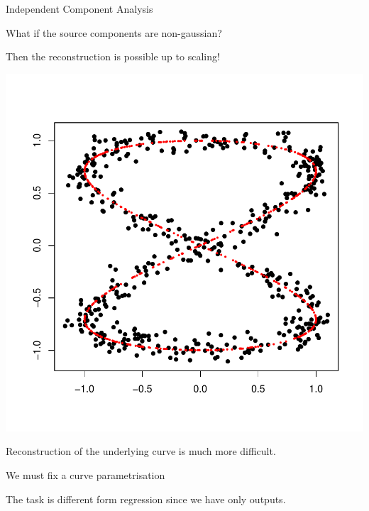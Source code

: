 \documentclass[landscape,footrule]{foils}
\begin{document}
Independent Component Analysis 
\begin{triangles}
\item What if the source components are non-gaussian? 
\item Then the reconstruction is possible up to scaling!
\end{triangles} 



\begin{center}
\includegraphics[scale=0.75]{principal-curve.pdf}
\end{center}\vspace*{-1cm}

Reconstruction of the underlying curve is much more difficult.
\begin{triangles}
\item We must fix a curve parametrisation 
\item The task is different form regression since we have only outputs.
\end{triangles} 
 


\end{document}
